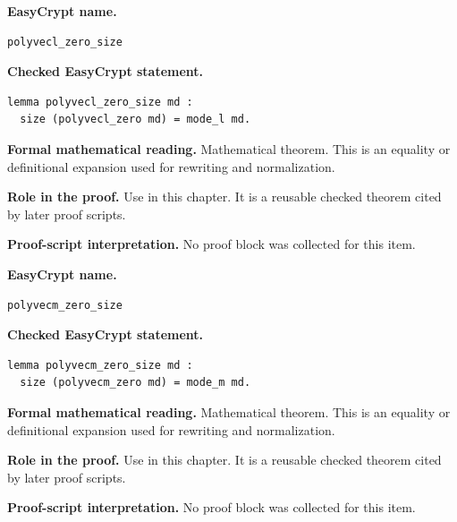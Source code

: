 \begin{formaltheorem}
\noindent\textbf{EasyCrypt name.}
\begin{lstlisting}[language=EasyCrypt,basicstyle=\ttfamily\scriptsize]
polyvecl_zero_size
\end{lstlisting}
\noindent\textbf{Checked EasyCrypt statement.}
\begin{lstlisting}[language=EasyCrypt,basicstyle=\ttfamily\scriptsize]
lemma polyvecl_zero_size md :
  size (polyvecl_zero md) = mode_l md.
\end{lstlisting}
\noindent\textbf{Formal mathematical reading.}
Mathematical theorem. This is an equality or definitional expansion used for rewriting and normalization.

\noindent\textbf{Role in the proof.}
Use in this chapter. It is a reusable checked theorem cited by later proof scripts.

\noindent\textbf{Proof-script interpretation.}
No proof block was collected for this item.

\end{formaltheorem}

\begin{formaltheorem}
\noindent\textbf{EasyCrypt name.}
\begin{lstlisting}[language=EasyCrypt,basicstyle=\ttfamily\scriptsize]
polyvecm_zero_size
\end{lstlisting}
\noindent\textbf{Checked EasyCrypt statement.}
\begin{lstlisting}[language=EasyCrypt,basicstyle=\ttfamily\scriptsize]
lemma polyvecm_zero_size md :
  size (polyvecm_zero md) = mode_m md.
\end{lstlisting}
\noindent\textbf{Formal mathematical reading.}
Mathematical theorem. This is an equality or definitional expansion used for rewriting and normalization.

\noindent\textbf{Role in the proof.}
Use in this chapter. It is a reusable checked theorem cited by later proof scripts.

\noindent\textbf{Proof-script interpretation.}
No proof block was collected for this item.

\end{formaltheorem}

